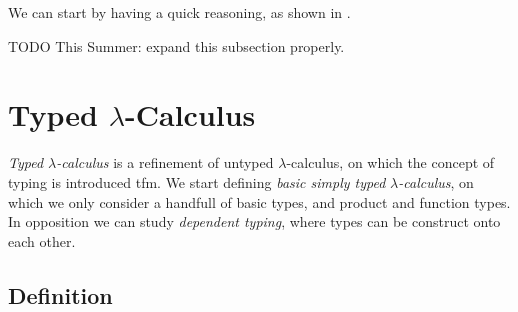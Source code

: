 We can start by having a quick reasoning, as shown in \cite{sep-lambda-calculus}.


{TODO This Summer: expand this subsection properly.}





 
\section{Typed $\lambda$-Calculus}
\emph{Typed $\lambda$-calculus} is a refinement of untyped $\lambda$-calculus, on which the concept of typing is introduced tfm. We start defining \emph{basic simply typed }$\lambda$\emph{-calculus}, on which we only consider a handfull of basic types, and product and function types. In opposition we can study \emph{dependent typing}, where types can be construct onto each other.

\subsection{Definition}

